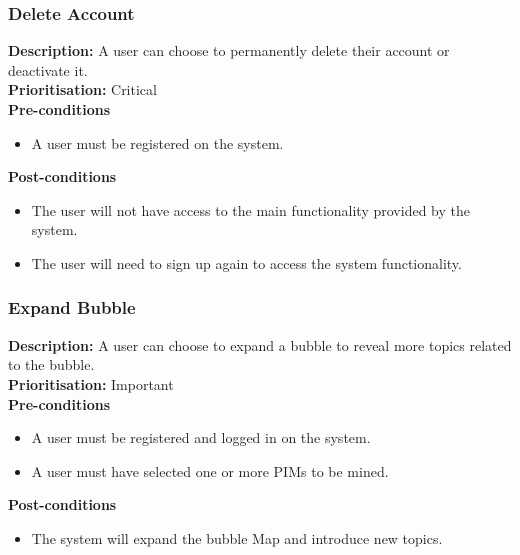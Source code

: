 \documentclass[hidelinks,english]{article}
\begin{document}
    		\subsubsection{Delete Account}
				\textbf{Description:}  A user can choose to permanently delete their account or deactivate it.\\
    			\textbf{Prioritisation:} Critical\\
      			\textbf{Pre-conditions}
    			\begin{itemize}
        			\item A user must be registered on the system.
    			\end{itemize}
    			\textbf{Post-conditions}
     			\begin{itemize}
        			\item The user will not have access to the main functionality provided by the system.
        			\item The user will need to sign up again to access the system functionality.
    			\end{itemize}
    			
		    \subsubsection{Expand Bubble}
				\textbf{Description:}  A user can choose to expand a bubble to reveal more topics related to the bubble.\\
			    \textbf{Prioritisation:} Important\\
      			\textbf{Pre-conditions}
			    \begin{itemize}
			        \item A user must be registered and logged in on the system.
			        \item A user must have selected one or more PIMs to be mined.
			    \end{itemize}
			    \textbf{Post-conditions}
			     \begin{itemize}
			        \item The system will expand the bubble Map and introduce new topics.
			    \end{itemize}
			    
\end{document}
